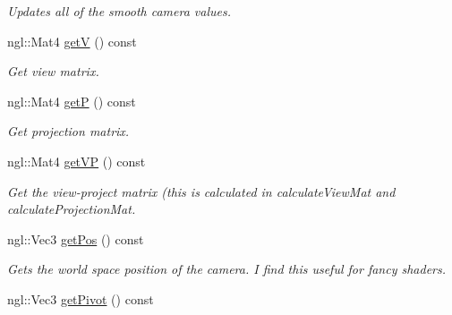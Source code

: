 \begin{DoxyCompactItemize}
\begin{DoxyCompactList}\small\item\em Updates all of the smooth camera values. \end{DoxyCompactList}\item 
\hypertarget{class_camera_a7f012165f2f2e474cbd4ff05b05c0249}{}ngl\+::\+Mat4 \hyperlink{class_camera_a7f012165f2f2e474cbd4ff05b05c0249}{get\+V} () const \label{class_camera_a7f012165f2f2e474cbd4ff05b05c0249}

\begin{DoxyCompactList}\small\item\em Get view matrix. \end{DoxyCompactList}\item 
\hypertarget{class_camera_abf7459390834b21d242c759ea6ec2b14}{}ngl\+::\+Mat4 \hyperlink{class_camera_abf7459390834b21d242c759ea6ec2b14}{get\+P} () const \label{class_camera_abf7459390834b21d242c759ea6ec2b14}

\begin{DoxyCompactList}\small\item\em Get projection matrix. \end{DoxyCompactList}\item 
\hypertarget{class_camera_a02c31a04acb4ace52e3337048deee6f0}{}ngl\+::\+Mat4 \hyperlink{class_camera_a02c31a04acb4ace52e3337048deee6f0}{get\+V\+P} () const \label{class_camera_a02c31a04acb4ace52e3337048deee6f0}

\begin{DoxyCompactList}\small\item\em Get the view-\/project matrix (this is calculated in calculate\+View\+Mat and calculate\+Projection\+Mat. \end{DoxyCompactList}\item 
\hypertarget{class_camera_a067b629d59f005fa12a7e0fede7a95ef}{}ngl\+::\+Vec3 \hyperlink{class_camera_a067b629d59f005fa12a7e0fede7a95ef}{get\+Pos} () const \label{class_camera_a067b629d59f005fa12a7e0fede7a95ef}

\begin{DoxyCompactList}\small\item\em Gets the world space position of the camera. I find this useful for fancy shaders. \end{DoxyCompactList}\item 
\hypertarget{class_camera_accfc15174be472e47240d80c4dc7c1f3}{}ngl\+::\+Vec3 \hyperlink{class_camera_accfc15174be472e47240d80c4dc7c1f3}{get\+Pivot} () const \label{class_camera_accfc15174be472e47240d80c4dc7c1f3}


\end{DoxyCompactItemize}
